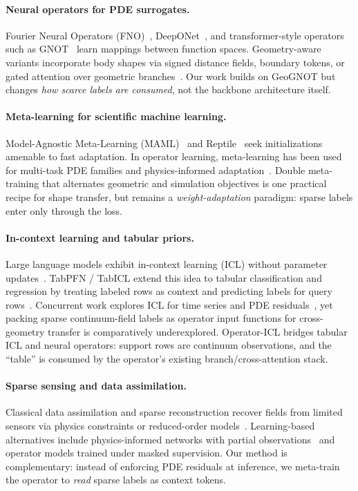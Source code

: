\documentclass[11pt,a4paper]{article}
\begin{document}
\paragraph{Neural operators for PDE surrogates.}
Fourier Neural Operators (FNO)~\cite{li2021fourier}, DeepONet~\cite{lu2021deeponet}, and transformer-style operators such as GNOT~\cite{hao2023gnot} learn mappings between function spaces.
Geometry-aware variants incorporate body shapes via signed distance fields, boundary tokens, or gated attention over geometric branches~\cite{li2023geo,hao2023gnot}.
Our work builds on GeoGNOT but changes \emph{how scarce labels are consumed}, not the backbone architecture itself.

\paragraph{Meta-learning for scientific machine learning.}
Model-Agnostic Meta-Learning (MAML)~\cite{finn2017maml} and Reptile~\cite{nichol2018reptile} seek initializations amenable to fast adaptation.
In operator learning, meta-learning has been used for multi-task PDE families and physics-informed adaptation~\cite{huang2022meta,li2022metalearning}.
Double meta-training that alternates geometric and simulation objectives is one practical recipe for shape transfer, but remains a \emph{weight-adaptation} paradigm: sparse labels enter only through the loss.

\paragraph{In-context learning and tabular priors.}
Large language models exhibit in-context learning (ICL) without parameter updates~\cite{brown2020language}.
TabPFN / TabICL extend this idea to tabular classification and regression by treating labeled rows as context and predicting labels for query rows~\cite{hollmann2022tabpfn,hollmann2025tabicl}.
Concurrent work explores ICL for time series and PDE residuals~\cite{chen2022transformerpde,yang2023incontext}, yet packing sparse continuum-field labels as operator input functions for cross-geometry transfer is comparatively underexplored.
Operator-ICL bridges tabular ICL and neural operators: support rows are continuum observations, and the ``table'' is consumed by the operator's existing branch/cross-attention stack.

\paragraph{Sparse sensing and data assimilation.}
Classical data assimilation and sparse reconstruction recover fields from limited sensors via physics constraints or reduced-order models~\cite{everson1995karhunen,callaham2021robust}.
Learning-based alternatives include physics-informed networks with partial observations~\cite{raissi2019pinn} and operator models trained under masked supervision.
Our method is complementary: instead of enforcing PDE residuals at inference, we meta-train the operator to \emph{read} sparse labels as context tokens.
\end{document}
